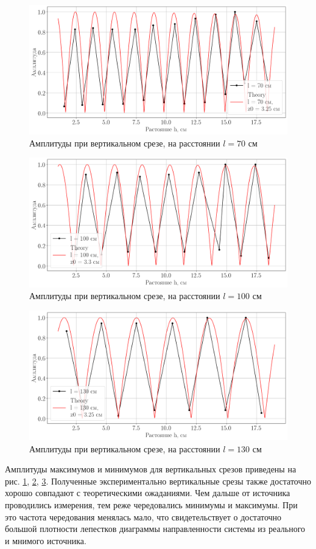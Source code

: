 \begin{figure}[h!]
	\centering
	\includegraphics[width =0.79\linewidth]{fig/task31}
	\caption{Амплитуды при вертикальном срезе, на расстоянии $l=70$ см}
	\label{fig:task31}
\end{figure}

\begin{figure}[h!]
	\centering
	\includegraphics[width =0.79\linewidth]{fig/task32}
	\caption{Амплитуды при вертикальном срезе, на расстоянии $l=100$ см}
	\label{fig:task32}
\end{figure}

\begin{figure}[h!]
	\centering
	\includegraphics[width =0.79\linewidth]{fig/task33}
	\caption{Амплитуды при вертикальном срезе, на расстоянии $l=130$ см}
	\label{fig:task33}
\end{figure}

Амплитуды максимумов и минимумов для вертикальных срезов приведены на рис. \ref{fig:task31}, \ref{fig:task32},
\ref{fig:task33}.
Полученные экспериментально вертикальные срезы также достаточно хорошо совпадают с теоретическими ожаданиями. Чем дальше
от источника проводились измерения, тем реже чередовались минимумы и максимумы. При это частота чередования менялась
мало, что свидетельствует о достаточно большой плотности лепестков диаграммы направленности системы из реального и
мнимого источника.

